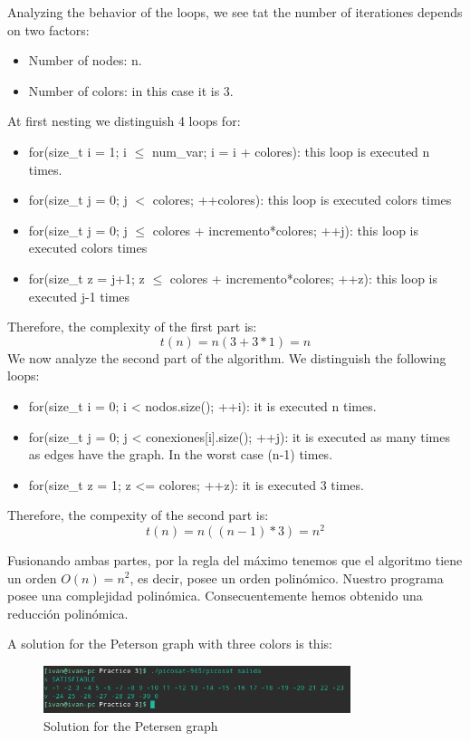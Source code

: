 \documentclass{article}
\begin{document}
    Analyzing the behavior of the loops, we see tat the number of iterationes depends on two factors:
    \begin{itemize}
        \item Number of nodes: n.
        \item Number of colors: in this case it is 3.
    \end{itemize}

    At first nesting we distinguish 4 loops for:
    \begin{itemize}
        \item for(size\_t i = 1; i $\leq$ num\_var; i = i + colores): this loop is executed n times.
        \item for(size\_t j = 0; j $<$ colores; ++colores): this loop is executed colors times
        \item for(size\_t j = 0; j $\leq$ colores + incremento*colores; ++j): this loop is executed colors times
        \item for(size\_t z = j+1; z $\leq$ colores + incremento*colores; ++z): this loop is executed j-1 times
    \end{itemize}
    
    Therefore, the complexity of the first part is: 
    \[t(n) = n(3+3*1) = n\]
    We now analyze the second part of the algorithm. We distinguish the following loops:
    \begin{itemize}
        \item for(size\_t i = 0; i < nodos.size(); ++i): it is executed n times.
        \item for(size\_t j = 0; j < conexiones[i].size(); ++j): it is executed as many times as edges have the graph. In the worst case (n-1) times.
        \item for(size\_t z = 1; z <= colores; ++z): it is executed 3 times.
    \end{itemize}
    
    Therefore, the compexity of the second part is:
    \[t(n) = n((n-1)*3) = n^2\]
    
    Fusionando ambas partes, por la regla del máximo tenemos que el algoritmo tiene un orden $O(n) = n^2$, es decir, posee un orden polinómico. 
    Nuestro programa posee una complejidad polinómica. Consecuentemente hemos obtenido una reducción polinómica.

    
    A solution for the Peterson graph with three colors is this:
    \begin{figure}[H]
            \centering
            \includegraphics[width=0.8\textwidth]{pictures/solution.png}
            \caption{Solution for the Petersen graph}
        \end{figure}
        
\end{document}
